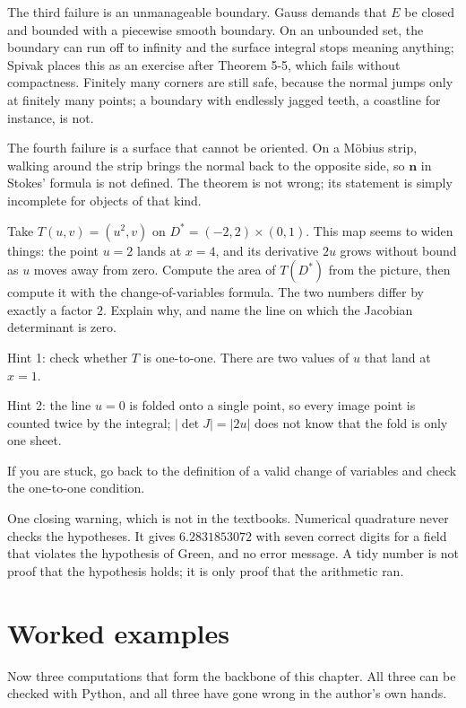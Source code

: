 The third failure is an unmanageable boundary. Gauss demands that $E$ be closed
and bounded with a piecewise smooth boundary. On an unbounded set,
the boundary can run off to infinity and the surface integral stops meaning anything;
Spivak places this as an exercise after Theorem 5-5, which fails without
compactness. Finitely many corners are still safe, because the normal jumps only at
finitely many points; a boundary with endlessly jagged teeth, a coastline for instance, is not.

The fourth failure is a surface that cannot be oriented. On a Möbius
strip, walking around the strip brings the normal back to the opposite
side, so $\mathbf{n}$ in Stokes' formula is not defined.
The theorem is not wrong; its statement is simply incomplete for objects of that kind.

\begin{tantangan}
Take $T(u,v)=(u^{2},v)$ on $D^{*}=(-2,2)\times(0,1)$. This map seems to
widen things: the point $u=2$ lands at $x=4$, and its derivative $2u$ grows without
bound as $u$ moves away from zero. Compute the area of $T(D^{*})$ from the picture, then
compute it with the change-of-variables formula. The two numbers differ by exactly a factor
$2$. Explain why, and name the line on which the Jacobian determinant is zero.

Hint 1: check whether $T$ is one-to-one. There are two values of $u$ that land at
$x=1$.

Hint 2: the line $u=0$ is folded onto a single point, so every image point
is counted twice by the integral; $|\det J|=|2u|$ does not know that the fold
is only one sheet.

If you are stuck, go back to the definition of a valid change of variables and check the
one-to-one condition.
\end{tantangan}

One closing warning, which is not in the textbooks. Numerical quadrature never
checks the hypotheses. It gives $6.2831853072$ with seven correct digits
for a field that violates the hypothesis of Green, and no error message. A tidy number is not proof that the hypothesis holds; it is only proof that
the arithmetic ran.

\section{Worked examples}

Now three computations that form the backbone of this chapter. All three can be checked
with Python, and all three have gone wrong in the author's own hands.

